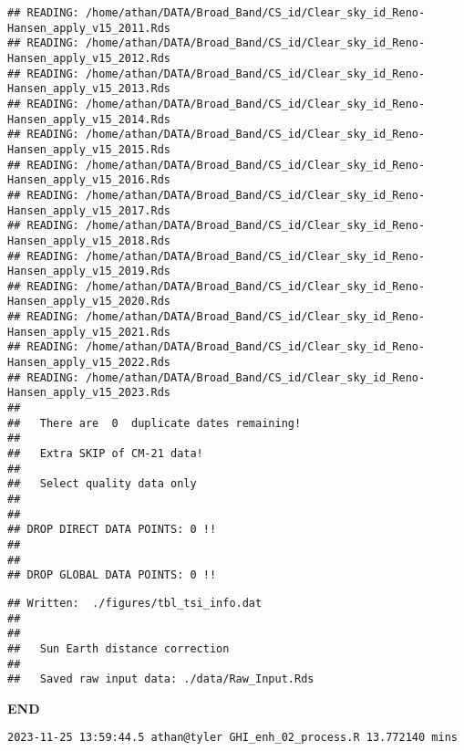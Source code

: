 \documentclass[
  10pt,
  a4paper,oneside]{article}
\begin{document}
\begin{verbatim}
## READING: /home/athan/DATA/Broad_Band/CS_id/Clear_sky_id_Reno-Hansen_apply_v15_2011.Rds 
## READING: /home/athan/DATA/Broad_Band/CS_id/Clear_sky_id_Reno-Hansen_apply_v15_2012.Rds 
## READING: /home/athan/DATA/Broad_Band/CS_id/Clear_sky_id_Reno-Hansen_apply_v15_2013.Rds 
## READING: /home/athan/DATA/Broad_Band/CS_id/Clear_sky_id_Reno-Hansen_apply_v15_2014.Rds 
## READING: /home/athan/DATA/Broad_Band/CS_id/Clear_sky_id_Reno-Hansen_apply_v15_2015.Rds 
## READING: /home/athan/DATA/Broad_Band/CS_id/Clear_sky_id_Reno-Hansen_apply_v15_2016.Rds 
## READING: /home/athan/DATA/Broad_Band/CS_id/Clear_sky_id_Reno-Hansen_apply_v15_2017.Rds 
## READING: /home/athan/DATA/Broad_Band/CS_id/Clear_sky_id_Reno-Hansen_apply_v15_2018.Rds 
## READING: /home/athan/DATA/Broad_Band/CS_id/Clear_sky_id_Reno-Hansen_apply_v15_2019.Rds 
## READING: /home/athan/DATA/Broad_Band/CS_id/Clear_sky_id_Reno-Hansen_apply_v15_2020.Rds 
## READING: /home/athan/DATA/Broad_Band/CS_id/Clear_sky_id_Reno-Hansen_apply_v15_2021.Rds 
## READING: /home/athan/DATA/Broad_Band/CS_id/Clear_sky_id_Reno-Hansen_apply_v15_2022.Rds 
## READING: /home/athan/DATA/Broad_Band/CS_id/Clear_sky_id_Reno-Hansen_apply_v15_2023.Rds 
## 
##   There are  0  duplicate dates remaining!
## 
##   Extra SKIP of CM-21 data!
## 
##   Select quality data only
## 
## 
## DROP DIRECT DATA POINTS: 0 !!
## 
## 
## DROP GLOBAL DATA POINTS: 0 !!
\end{verbatim}

\begin{verbatim}
## Written:  ./figures/tbl_tsi_info.dat 
## 
## 
##   Sun Earth distance correction
## 
##   Saved raw input data: ./data/Raw_Input.Rds
\end{verbatim}

\textbf{END}

\begin{verbatim}
2023-11-25 13:59:44.5 athan@tyler GHI_enh_02_process.R 13.772140 mins
\end{verbatim}
\end{document}
